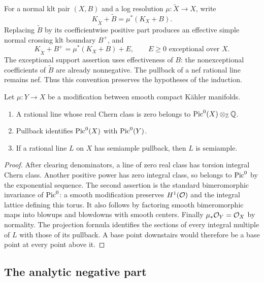 For a normal klt pair \((X,B)\) and a log resolution \(\mu:\widetilde X\to X\),
write
\[
 K_{\widetilde X}+\widetilde B=\mu^*(K_X+B).
\]
Replacing \(\widetilde B\) by its coefficientwise positive part produces
an effective simple normal crossing klt boundary \(B^+\), and
\begin{equation}\label{pre:resolution-error}
 K_{\widetilde X}+B^+=\mu^*(K_X+B)+E,
 \qquad E\geq0\text{ exceptional over }X.
\end{equation}
The exceptional support assertion uses effectiveness of \(B\): the
nonexceptional coefficients of \(\widetilde B\) are already nonnegative.
The pullback of a nef rational line remains nef. Thus this convention
preserves the hypotheses of the induction.

\begin{lemma}\label{pre:picard}
Let \(\mu:Y\to X\) be a modification between smooth compact K\"ahler
manifolds.
\begin{enumerate}
\item A rational line whose real Chern class is zero belongs to
\(\operatorname{Pic}^0(X)\otimes_{\mathbb Z}\mathbb Q\).
\item Pullback identifies \(\operatorname{Pic}^0(X)\) with \(\operatorname{Pic}^0(Y)\).
\item If a rational line \(L\) on \(X\) has semiample pullback, then \(L\)
is semiample.
\end{enumerate}
\end{lemma}
\begin{proof}
After clearing denominators, a line of zero real class has torsion
integral Chern class. Another positive power has zero integral class,
so belongs to \(\operatorname{Pic}^0\) by the exponential sequence.
The second assertion is the standard bimeromorphic invariance of
\(\operatorname{Pic}^0\): a smooth modification preserves \(H^1(\mathcal O)\) and the
integral lattice defining this torus. It also follows by factoring
smooth bimeromorphic maps into blowups and blowdowns with smooth centers.
Finally \(\mu_*\mathcal O_Y=\mathcal O_X\) by normality. The projection formula identifies
the sections of every integral multiple of \(L\) with those of its
pullback. A base point downstairs would therefore be a base point at
every point above it.
\end{proof}

\subsection{The analytic negative part}


